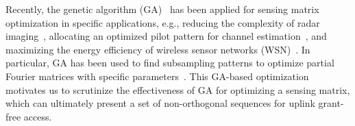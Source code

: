 \documentclass[journal]{IEEEtran}
\numberwithin{const2}{const}
\begin{document}
Recently, the genetic algorithm (GA)~\cite{Holland:gen} has been applied 
for sensing matrix optimization in specific applications,
e.g., reducing the complexity of %
radar imaging~\cite{Chen:ISAR}, allocating an optimized pilot pattern for channel estimation~\cite{Nie:maga}, 
and maximizing the energy efficiency of wireless sensor networks (WSN)~\cite{Leven:moga}.
In particular, 
GA has been used
to find subsampling patterns to optimize partial Fourier matrices
with specific parameters~\cite{Chen:ISAR, Nie:maga}.
This GA-based optimization motivates us to scrutinize the effectiveness of GA %
for optimizing a sensing matrix, which can ultimately present a set of 
non-orthogonal sequences for uplink grant-free access.
\end{document}
